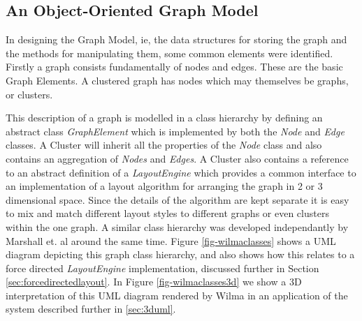 \documentclass[runningheads]{cl2emult}
\begin{document}
\subsection{An Object-Oriented Graph Model}
In designing the Graph Model, ie, the data structures for storing the
graph and the methods for manipulating them, some common
elements were identified.  Firstly a graph consists fundamentally
of nodes and edges.  These are the basic Graph Elements.  A clustered
graph has nodes which may themselves be graphs, or clusters.

This description of a graph is modelled in a class hierarchy by
defining an abstract class {\em GraphElement} which is implemented by
both the {\em Node} and {\em Edge} classes.  A {Cluster} will inherit
all the properties of the {\em Node} class and also contains an
aggregation of {\em Nodes} and {\em Edges}.  A {Cluster} also contains
a reference to an abstract definition of a {\em LayoutEngine} which
provides a common interface to an implementation of a layout algorithm
for arranging the graph in 2 or 3 dimensional space.  Since the
details of the algorithm are kept separate it is easy to mix and match
different layout styles to different graphs or even clusters within
the one graph.  A similar class hierarchy was developed independantly
by Marshall et.  al\cite{marshall00object} around the same time.
Figure \ref{fig-wilmaclasses} shows a UML diagram depicting this
graph class hierarchy, and also shows how this relates to a force
directed {\em LayoutEngine} implementation, discussed further in
Section \ref{sec:forcedirectedlayout}.  In Figure
\ref{fig-wilmaclasses3d} we show a 3D
interpretation of this UML diagram rendered by Wilma in an application
of the system described further in \ref{sec:3duml}.
\end{document}
